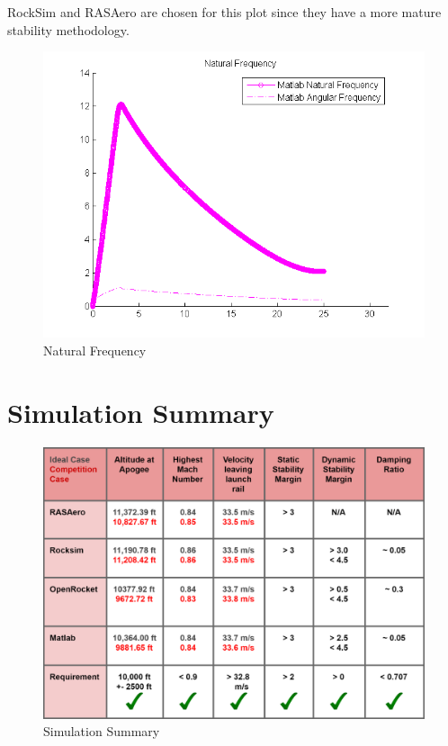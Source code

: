 \documentclass[]{book}
\begin{document}
RockSim and RASAero are chosen for this plot since they have a more
mature stability methodology.

\begin{figure}[htbp]
\centering
\includegraphics{images/plots/plot_natural_frequency.png}
\caption{Natural Frequency \label{plot_natural_frequency}}
\end{figure}

\clearpage

\section{Simulation Summary}\label{simulation-summary}

\begin{figure}[htbp]
\centering
\includegraphics{images/simulation_summary.png}
\caption{Simulation Summary \label{plt_simulation_summary}}
\end{figure}
\end{document}
